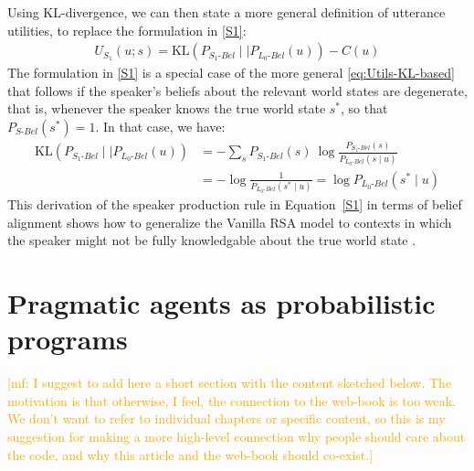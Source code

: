 \documentclass{sp}
\newcommand{\mf}[1]{\textcolor{orange}{[mf: #1]}}
\begin{document}
Using KL-divergence, we can then state a more general definition of utterance utilities, to
replace the formulation in \eqref{S1}:
\begin{align}
  \label{eq:Utils-KL-based}
  U_{S_1}(u; s) = \text{KL}(P_{S_{1}\text{-}Bel} \mid \mid P_{L_{0}\text{-}Bel}(u)) - C(u)
\end{align}
The formulation in \eqref{S1} is a special case of the more general \eqref{eq:Utils-KL-based}
that follows if the speaker's beliefs about the relevant world states are degenerate, that is,
whenever the speaker knows the true world state $s^{*}$, so that $P_{S\text{-}Bel}(s^{*})=1$.
In that case, we have:
\begin{align*}
  \text{KL}(P_{S_{1}\text{-}Bel} \mid \mid P_{L_{0}\text{-}Bel}(u)) & = - \sum_{s} P_{S_{1}\text{-}Bel}(s) \ \log \frac{P_{S_{1}\text{-}Bel}(s)}{P_{L_{0}\text{-}Bel}(s \mid u)} \\
  & =  - \log\frac{1}{P_{L_{0}\text{-}Bel}(s^* \mid u)} = \log P_{L_{0}\text{-}Bel}(s^* \mid u)
\end{align*}
This derivation of the speaker production rule in Equation~\eqref{S1} in terms of belief alignment shows how to generalize the Vanilla RSA model to contexts in which the speaker might not be fully knowledgable about the true world state \citep{goodmanstuhlmuller2013,HerbstrittFranke2019:Complex-probabi}.

\section{Pragmatic agents as probabilistic programs}

\mf{I suggest to add here a short section with the content sketched below. The motivation is that otherwise, I feel, the connection to the web-book is too weak. We don't want to refer to individual chapters or specific content, so this is my suggestion for making a more high-level connection why people should care about the code, and why this article and the web-book should co-exist.}
\end{document}
